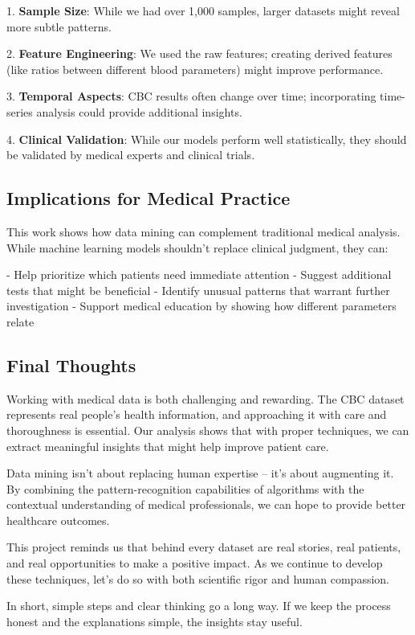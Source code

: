 \documentclass[12pt,a4paper]{article}
\begin{document}
1. \textbf{Sample Size}: While we had over 1,000 samples, larger datasets might reveal more subtle patterns.

2. \textbf{Feature Engineering}: We used the raw features; creating derived features (like ratios between different blood parameters) might improve performance.

3. \textbf{Temporal Aspects}: CBC results often change over time; incorporating time-series analysis could provide additional insights.

4. \textbf{Clinical Validation}: While our models perform well statistically, they should be validated by medical experts and clinical trials.

\subsection{Implications for Medical Practice}

This work shows how data mining can complement traditional medical analysis. While machine learning models shouldn't replace clinical judgment, they can:

- Help prioritize which patients need immediate attention
- Suggest additional tests that might be beneficial
- Identify unusual patterns that warrant further investigation
- Support medical education by showing how different parameters relate

\subsection{Final Thoughts}

Working with medical data is both challenging and rewarding. The CBC dataset represents real people's health information, and approaching it with care and thoroughness is essential. Our analysis shows that with proper techniques, we can extract meaningful insights that might help improve patient care.

Data mining isn't about replacing human expertise – it's about augmenting it. By combining the pattern-recognition capabilities of algorithms with the contextual understanding of medical professionals, we can hope to provide better healthcare outcomes.

This project reminds us that behind every dataset are real stories, real patients, and real opportunities to make a positive impact. As we continue to develop these techniques, let's do so with both scientific rigor and human compassion.

In short, simple steps and clear thinking go a long way. If we keep the process honest and the explanations simple, the insights stay useful.

\clearpage
\end{document}

